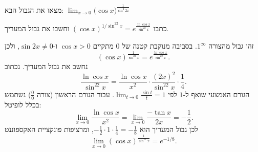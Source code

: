 
\begin{question}
מצאו את הגבול הבא:
$\displaystyle\lim_{x\to0}\big(\cos x\big)^{\frac{1}{\sin^2 2x}}$
\end{question}

\begin{hint}
כתבו $(\cos x)^{1/\sin^22x}=e^{\frac{\ln\cos x}{\sin^22x}}$ וחשבו את גבול המעריך.
\end{hint}

\begin{solution}
זהו גבול מהצורה $1^\infty$. בסביבה מנוקבת קטנה של $0$ מתקיים $\cos x>0$ ו-$\sin2x\neq0$, ולכן
\[ (\cos x)^{\frac1{\sin^22x}}=e^{\frac{\ln\cos x}{\sin^22x}}. \]
נחשב את גבול המעריך. נכתוב
\[ \frac{\ln\cos x}{\sin^22x}=\frac{\ln\cos x}{x^2}\cdot\frac{(2x)^2}{\sin^22x}\cdot\frac14. \]
הגורם האמצעי שואף ל-$1$ לפי $\lim_{t\to0}\frac{\sin t}{t}=1$. עבור הגורם הראשון (צורה $\frac00$) נשתמש בכלל לופיטל:
\[ \lim_{x\to0}\frac{\ln\cos x}{x^2}=\lim_{x\to0}\frac{-\tan x}{2x}=-\frac12. \]
לכן גבול המעריך הוא $-\frac12\cdot1\cdot\frac14=-\frac18$, ומרציפות פונקציית האקספוננט
\[ \lim_{x\to0}(\cos x)^{\frac1{\sin^22x}}=e^{-1/8}. \]
\end{solution}
